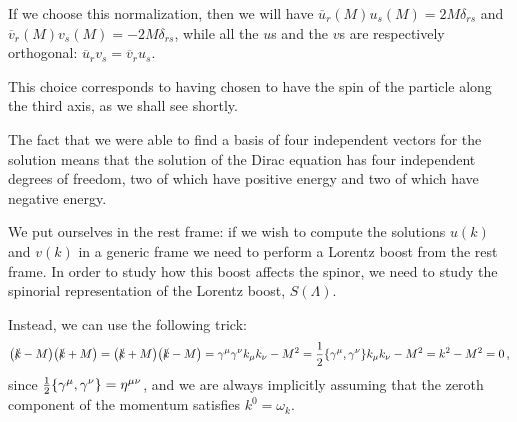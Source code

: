 \documentclass[main.tex]{subfiles}
\begin{document}
If we choose this normalization, then we will have \(\overline{u}_{r}(M) u_s(M) = 2 M \delta_{rs}\) and \(\overline{v}_{r}(M) v_s(M) =- 2 M \delta_{rs}\), while all the \(u\)s and the \(v\)s are respectively orthogonal: \(\overline{u}_{r} v_s =  \overline{v}_{r} u_s\). 

This choice corresponds to having chosen to have the spin of the particle along the third axis, as we shall see shortly. 

The fact that we were able to find a basis of four independent vectors for the solution means that the solution of the Dirac equation has four independent degrees of freedom, two of which have positive energy and two of which have negative energy. 

We put ourselves in the rest frame: if we wish to compute the solutions \(u(k)\) and \(v(k)\) in a generic frame we need to perform a Lorentz boost from the rest frame. 
In order to study how this boost affects the spinor, we need to study the spinorial representation of the Lorentz boost, \(S(\Lambda)\). 

Instead, we can use the following trick: 
%
\begin{align}
\qty(\slashed{k} - M) \qty(\slashed{k} + M) 
=
\qty(\slashed{k} + M) \qty(\slashed{k} - M)
= \gamma^{\mu } \gamma^{\nu } k_{\mu }k_{\nu } - M^2  = \frac{1}{2} \qty{\gamma^{\mu }, \gamma^{\nu }} k_{\mu } k_{\nu } - M^2 = k^2-M^2 = 0
\,,
\end{align}
%
since \( \frac{1}{2} \qty{\gamma^{\mu }, \gamma^{\nu }} = \eta^{\mu \nu }\), and we are always implicitly assuming that the zeroth component of the momentum satisfies \(k^{0} = \omega_{k}\).
\end{document}
